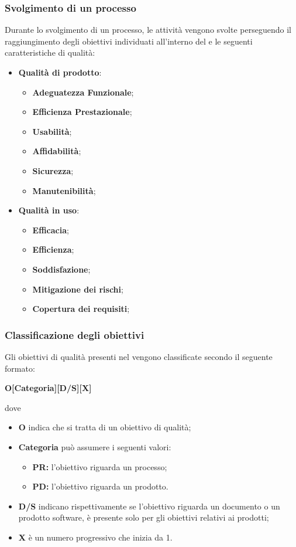 \subsubsection{Svolgimento di un processo}
Durante lo svolgimento di un processo, le attività vengono svolte perseguendo il raggiungimento degli obiettivi individuati all'interno del \PdQv{} e le seguenti caratteristiche di qualità:
\begin{itemize}
	\item \textbf{Qualità di prodotto}: 
	\begin{itemize}
		\item \textbf{Adeguatezza Funzionale};
		\item \textbf{Efficienza Prestazionale};
		\item \textbf{Usabilità};
		\item \textbf{Affidabilità};
		\item \textbf{Sicurezza};
		\item \textbf{Manutenibilità};
	\end{itemize}
	\item \textbf{Qualità in uso}: 
	\begin{itemize}
		\item \textbf{Efficacia};
		\item \textbf{Efficienza};
		\item \textbf{Soddisfazione};
		\item \textbf{Mitigazione dei rischi};
		\item \textbf{Copertura dei requisiti};
	\end{itemize}
\end{itemize}
\subsubsection{Classificazione degli obiettivi}
Gli obiettivi di qualità presenti nel \PdQv{} vengono classificate secondo il seguente formato:
\begin{center}
	\textbf{O[Categoria][D/S][X]}
\end{center}
dove 
\begin{itemize}
	\item \textbf{O} indica che si tratta di un obiettivo di qualità;
	\item \textbf{Categoria} può assumere i seguenti valori:
	\begin{itemize}
		\item \textbf{PR:} l'obiettivo riguarda un processo;
		\item \textbf{PD:} l'obiettivo riguarda un prodotto.
	\end{itemize}
	\item \textbf{D/S} indicano rispettivamente se l'obiettivo riguarda un documento o un prodotto software, è presente solo per gli obiettivi relativi ai prodotti;
	\item \textbf{X} è un numero progressivo che inizia da 1.
\end{itemize}
